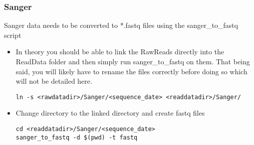 \documentclass{article}
\begin{document}
\subsubsection{Sanger}
Sanger data needs to be converted to *.fastq files using the sanger\_to\_fastq script
\begin{itemize}
 \item In theory you should be able to link the RawReads directly into the ReadData folder and then simply run sanger\_to\_fastq on them. That being said, you will likely have to rename the files correctly before doing so which will not be detailed here.
\begin{lstlisting}
ln -s <rawdatadir>/Sanger/<sequence_date> <readdatadir>/Sanger/
\end{lstlisting}
 \item Change directory to the linked directory and create fastq files
\begin{lstlisting}
cd <readdatadir>/Sanger/<sequence_date>
sanger_to_fastq -d $(pwd) -t fastq
\end{lstlisting}
\end{itemize}
\end{document}
